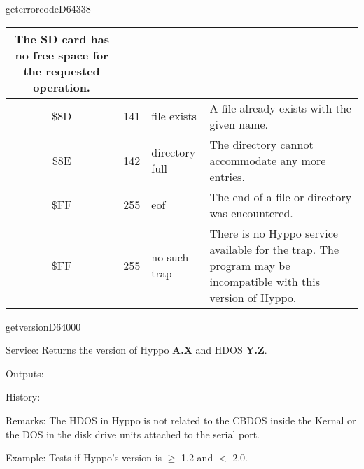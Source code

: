 \begin{hyppotrap}{geterrorcode}{D643}{38}
{\begin{longtable}{|c|r|l|p{8cm}|}
    The SD card has no free space for the requested operation.
    \\\hline
    \index{Hyppo Error Codes!\$8D}
    \$8D & 141 & file exists &
    A file already exists with the given name.
    \\\hline
    \index{Hyppo Error Codes!\$8E}
    \$8E & 142 & directory full &
    The directory cannot accommodate any more entries.
    \\\hline
    \index{Hyppo Error Codes!\$FF}
    \$FF & 255 & eof &
    The end of a file or directory was encountered.
    \\\hline
    \index{Hyppo Error Codes!\$FF}
    \$FF & 255 & no such trap &
    There is no Hyppo service available for the trap. The program may be
    incompatible with this version of Hyppo.
    \\\hline
  \end{longtable}
}
\end{hyppotrap}


\newpage
\begin{hyppotrap}{getversion}{D640}{00}
\item [Service:]
  Returns the version of Hyppo \textbf{A.X} and HDOS \textbf{Y.Z}.
\item [Outputs:]
\item [History:]
\item [Remarks:]
  The HDOS in Hyppo is not related to the CBDOS inside the Kernal or the
  DOS in the disk drive units attached to the serial port.
\item [Example:]
  Tests if Hyppo's version is $\geq$ 1.2 and $<$ 2.0.
\end{hyppotrap}


